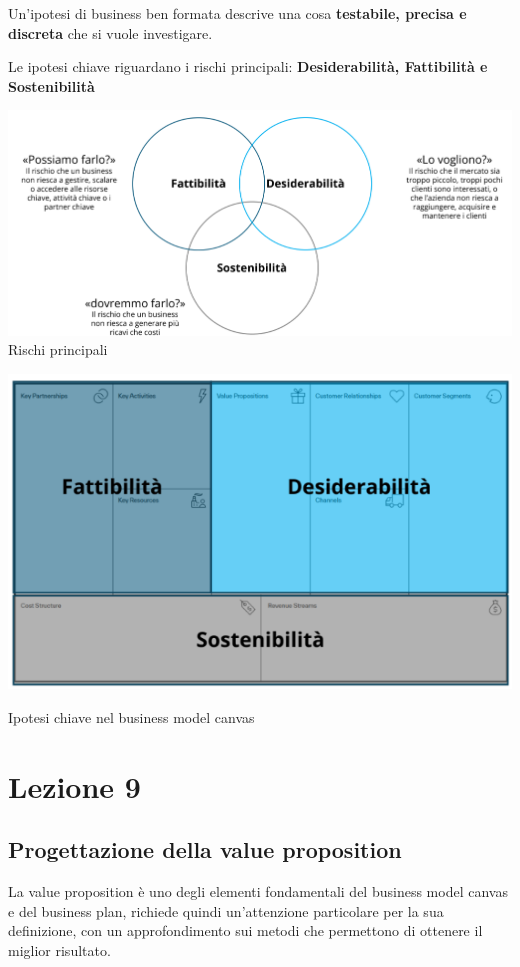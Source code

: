 \documentclass[14pt]{extarticle}
\begin{document}
\newpage
Un'ipotesi di business ben formata descrive una cosa \textbf{testabile, precisa
e discreta} che si vuole investigare.

Le ipotesi chiave riguardano i rischi principali: \textbf{Desiderabilità,
Fattibilità e Sostenibilità}

\begin{center}
    \includegraphics[scale=0.55]{images/rischi.png}
    Rischi principali

    \includegraphics[scale=0.80]{images/ipotesi.png}
    
    Ipotesi chiave nel business model canvas
\end{center}

\section{Lezione 9}

\subsection{Progettazione della value proposition}

La value proposition è uno degli elementi fondamentali del business model canvas
e del business plan, richiede quindi un'attenzione particolare per la sua
definizione, con un approfondimento sui metodi che permettono di ottenere il
miglior risultato.
\end{document}

